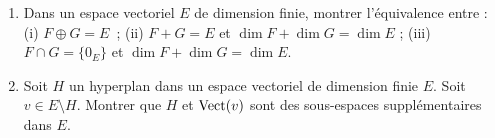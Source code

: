 \begin{frame}
\begin{miniexercice}
\begin{enumerate}
  \item Dans un espace vectoriel $E$ de dimension finie, montrer l'équivalence entre :
  (i) $F\oplus G = E$~; 
  (ii) $F+G=E$ et $\dim F + \dim G = \dim E$ ;
  (iii) $F \cap G = \{0_E\}$ et $\dim F + \dim G = \dim E$.
  
  \item Soit $H$ un hyperplan dans un espace vectoriel de dimension finie $E$. Soit $v\in E\setminus H$.
  Montrer que $H$ et $\mathop{\text{Vect}}\nolimits(v)$ sont des sous-espaces supplémentaires dans $E$.

\end{enumerate}
\vspace*{-2ex}
\end{miniexercice}
\end{frame}

